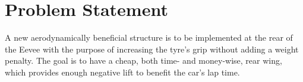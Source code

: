 \section{Problem Statement}

  A new aerodynamically beneficial structure is to be implemented at the rear of the Eevee with the purpose of increasing the tyre's grip without adding a weight penalty. The goal is to have a cheap, both time- and money-wise, rear wing, which provides enough negative lift to benefit the car's lap time.
